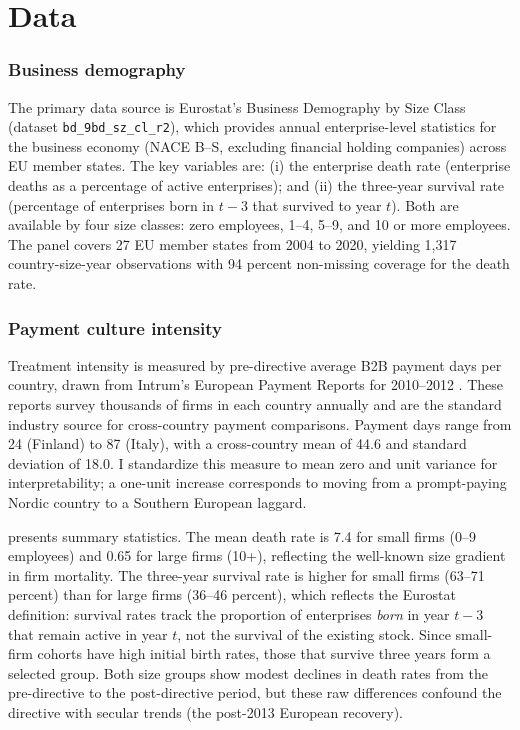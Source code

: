 \documentclass[12pt]{article}
\begin{document}
\section{Data}
\label{sec:data}

\subsubsection*{Business demography} The primary data source is Eurostat's Business Demography by Size Class (dataset \texttt{bd\_9bd\_sz\_cl\_r2}), which provides annual enterprise-level statistics for the business economy (NACE B--S, excluding financial holding companies) across EU member states. The key variables are: (i) the enterprise death rate (enterprise deaths as a percentage of active enterprises); and (ii) the three-year survival rate (percentage of enterprises born in $t-3$ that survived to year $t$). Both are available by four size classes: zero employees, 1--4, 5--9, and 10 or more employees. The panel covers 27 EU member states from 2004 to 2020, yielding 1,317 country-size-year observations with 94 percent non-missing coverage for the death rate.

\subsubsection*{Payment culture intensity} Treatment intensity is measured by pre-directive average B2B payment days per country, drawn from Intrum's European Payment Reports for 2010--2012 \citep{Intrum2012}. These reports survey thousands of firms in each country annually and are the standard industry source for cross-country payment comparisons. Payment days range from 24 (Finland) to 87 (Italy), with a cross-country mean of 44.6 and standard deviation of 18.0. I standardize this measure to mean zero and unit variance for interpretability; a one-unit increase corresponds to moving from a prompt-paying Nordic country to a Southern European laggard.

 presents summary statistics. The mean death rate is 7.4 for small firms (0--9 employees) and 0.65 for large firms (10+), reflecting the well-known size gradient in firm mortality. The three-year survival rate is higher for small firms (63--71 percent) than for large firms (36--46 percent), which reflects the Eurostat definition: survival rates track the proportion of enterprises \emph{born} in year $t-3$ that remain active in year $t$, not the survival of the existing stock. Since small-firm cohorts have high initial birth rates, those that survive three years form a selected group. Both size groups show modest declines in death rates from the pre-directive to the post-directive period, but these raw differences confound the directive with secular trends (the post-2013 European recovery).
\end{document}
